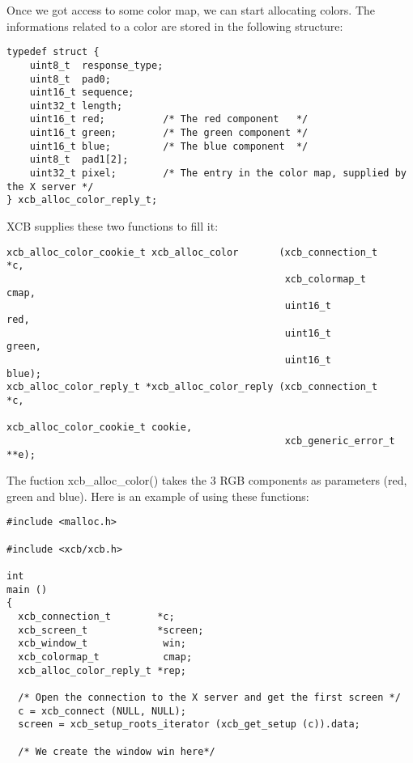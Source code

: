 \documentclass[12pt,oneside,titlepage]{book}
\begin{document}
\begin{enumerate}
\begin{enumerate}
    Once we got access to some color map, we can start allocating
    colors. The informations related to a color are stored in the
    following structure:

\begin{verbatim}
typedef struct {
    uint8_t  response_type;
    uint8_t  pad0;
    uint16_t sequence;
    uint32_t length;
    uint16_t red;          /* The red component   */
    uint16_t green;        /* The green component */
    uint16_t blue;         /* The blue component  */
    uint8_t  pad1[2];
    uint32_t pixel;        /* The entry in the color map, supplied by the X server */
} xcb_alloc_color_reply_t;
\end{verbatim}

    XCB supplies these two functions to fill it:

\begin{verbatim}
xcb_alloc_color_cookie_t xcb_alloc_color       (xcb_connection_t        *c,
                                                xcb_colormap_t           cmap,
                                                uint16_t                 red,
                                                uint16_t                 green,
                                                uint16_t                 blue);
xcb_alloc_color_reply_t *xcb_alloc_color_reply (xcb_connection_t        *c,
                                                xcb_alloc_color_cookie_t cookie,
                                                xcb_generic_error_t    **e);
\end{verbatim}

    The fuction {xcb\_alloc\_color()} takes the 3 RGB components as
    parameters (red, green and blue). Here is an example of using these
    functions:

\begin{verbatim}
#include <malloc.h>

#include <xcb/xcb.h>

int
main ()
{
  xcb_connection_t        *c;
  xcb_screen_t            *screen;
  xcb_window_t             win;
  xcb_colormap_t           cmap;
  xcb_alloc_color_reply_t *rep;

  /* Open the connection to the X server and get the first screen */
  c = xcb_connect (NULL, NULL);
  screen = xcb_setup_roots_iterator (xcb_get_setup (c)).data;

  /* We create the window win here*/


\end{verbatim}
\end{enumerate}
\end{enumerate}
\end{document}
